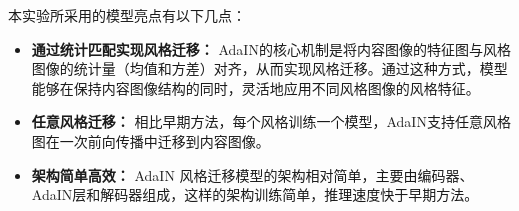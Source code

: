 \documentclass[UTF8,openany]{ctexbook}
\begin{document}
本实验所采用的模型亮点有以下几点：

\begin{itemize}[nosep]
    \item \textbf{通过统计匹配实现风格迁移：} AdaIN的核心机制是将内容图像的特征图与风格图像的统计量（均值和方差）对齐，从而实现风格迁移。通过这种方式，模型能够在保持内容图像结构的同时，灵活地应用不同风格图像的风格特征。
    \item \textbf{任意风格迁移：} 相比早期方法\cite{gatys2016image}，每个风格训练一个模型，AdaIN支持任意风格图在一次前向传播中迁移到内容图像。
    \item \textbf{架构简单高效：} AdaIN 风格迁移模型的架构相对简单，主要由编码器、AdaIN层和解码器组成，这样的架构训练简单，推理速度快于早期方法\cite{gatys2016image}。
\end{itemize}
\end{document}
